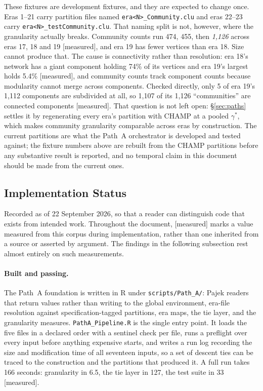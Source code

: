 \documentclass[11pt]{article}
\newcommand{\meas}{{\footnotesize\textsf{[measured]}}}
\newcommand{\code}[1]{\texttt{\small #1}}
\begin{document}
These fixtures are development fixtures, and they are expected to change once. Eras 1--21
carry partition files named \code{era<N>\_Community.clu} and eras 22--23 carry
\code{era<N>\_testCommunity.clu}. That naming split is not, however, where the granularity
actually breaks. Community counts run 474, 455, then \emph{1{,}126} across eras 17, 18 and
19 \meas{}, and era 19 has fewer vertices than era 18. Size cannot produce that. The cause is
connectivity rather than resolution: era 18's network has a giant component holding 74\% of
its vertices and era 19's largest holds 5.4\% \meas{}, and community counts track component
counts because modularity cannot merge across components. Checked directly, only 5 of era
19's 1{,}112 components are subdivided at all, so 1{,}107 of its 1{,}126 ``communities'' are
connected components \meas{}. That question is not left open: \S\ref{sec:paths} settles
it by regenerating every era's partition with CHAMP at a pooled $\gamma^{*}$, which makes
community granularity comparable across eras by construction. The current partitions are what
the Path~A orchestrator is developed and tested against; the fixture numbers above are
rebuilt from the CHAMP partitions before any substantive result is reported, and no temporal
claim in this document should be made from the current ones.

\subsection{Implementation Status}

Recorded as of 22 September 2026, so that a reader can distinguish code that exists from
intended work. Throughout the document, \meas{} marks a value measured from this corpus
during implementation, rather than one inherited from a source or asserted by argument. The
findings in the following subsection rest almost entirely on such measurements.

\paragraph{Built and passing.} The Path~A foundation is written in R under
\code{scripts/Path\_A/}: Pajek readers that return values rather than writing to the global
environment, era-file resolution against specification-tagged partitions, era maps, the tie
layer, and the granularity measures. \code{PathA\_Pipeline.R} is the single entry point.
It loads the five files in a declared order with a sentinel check per file, runs a preflight
over every input before anything expensive starts, and writes a run log recording the size
and modification time of all seventeen inputs, so a set of descent ties can be traced to the
construction and the partitions that produced it. A full run takes 166 seconds: granularity
in 6.5, the tie layer in 127, the test suite in 33 \meas{}.
\end{document}
